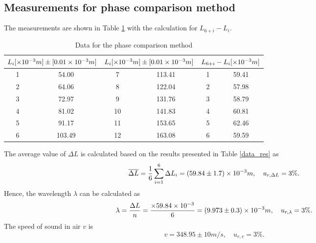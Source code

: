 \subsection{Measurements for phase comparison method}
    The measurements are shown in Table \ref{data_pha} with the calculation for $L_{6+i}-L_i$.
    \begin{table}[h] \small
        \centering
        \begin{tabular}{|c|c|c|c|c|c|}
        \hline
            \multicolumn{2}{|c|}{$L_i[\times10^{-3}m]\pm[0.01\times10^{-3}m]$} & 
            \multicolumn{2}{|c|}{$L_i[\times10^{-3}m]\pm[0.01\times10^{-3}m]$} &
            \multicolumn{2}{|c|}{$L_{6+i}-L_i[\times10^{-3}m]$}\\\hline
            1 & 54.00 & 7 & 113.41 & 1 & 59.41 \\\hline
            2 & 64.06 & 8 & 122.04 & 2 & 57.98 \\\hline
            3 & 72.97 & 9 & 131.76 & 3 & 58.79 \\\hline
            4 & 81.02 & 10 & 141.83 & 4 & 60.81 \\\hline
            5 & 91.17 & 11 & 153.65 & 5 & 62.46 \\\hline
            6 & 103.49 & 12 & 163.08 & 6 & 59.59 \\\hline
        \end{tabular}
        \caption{Data for the phase comparison method}\label{data_pha}
    \end{table}
    The average value of $\Delta L$ is calculated  based on the results presented in Table \ref{data_res} as
    \[
        \overline{\Delta L}=\frac{1}{6}\sum_{i=1}^{6}\Delta L_i=(59.84\pm 1.7)\times10^{-3}m,\quad u_{r,\Delta L}=3\%.
    \]
    Hence, the wavelength $\lambda$ can be calculated as
    \[
        \lambda=\frac{\Delta L}{n}=\frac{\times59.84\times10^{-3}}{6}=(9.973\pm0.3)\times10^{-3}m,\quad u_{r,\lambda}=3\%.
    \]
    The speed of sound in air $v$ is
    \[
        v=348.95\pm10 m/s,\quad u_{r,v}=3\%.
    \]
